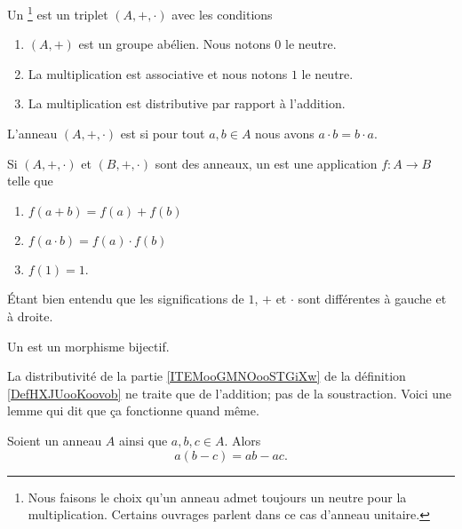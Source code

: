 \begin{definition}     \label{DefHXJUooKoovob}
    Un \footnote{Nous faisons le choix qu'un anneau admet toujours un neutre pour la multiplication. Certains ouvrages parlent dans ce cas d'anneau unitaire.} est un triplet \( (A,+,\cdot)\) avec les conditions
    \begin{enumerate}
        \item
            \( (A,+)\) est un groupe abélien. Nous notons \( 0\) le neutre.
        \item
            La multiplication est associative et nous notons \( 1\) le neutre.
        \item       \label{ITEMooGMNOooSTGiXw}
            La multiplication est distributive par rapport à l'addition.
    \end{enumerate}
    L'anneau \( (A,+,\cdot)\) est  si pour tout \( a,b\in A\) nous avons \( a\cdot b=b\cdot a\).
\end{definition}

\begin{definition}      \label{DEFooSPHPooCwjzuz}
    Si \( (A,+,\cdot)\) et \( (B,+,\cdot)\) sont des anneaux, un  est une application \( f\colon A\to B\) telle que
    \begin{enumerate}
        \item \( f(a+b)=f(a)+f(b)\)
        \item
            \( f(a\cdot b)=f(a)\cdot f(b)\)
        \item
            \( f(1)=1\).
    \end{enumerate}
    Étant bien entendu que les significations de \( 1\), $+$ et \( \cdot\) sont différentes à gauche et à droite.
\end{definition}

\begin{definition}      \label{DEFooKWKGooIOwGTA}
    Un  est un morphisme bijectif.
\end{definition}

La distributivité de la partie \ref{ITEMooGMNOooSTGiXw} de la définition \ref{DefHXJUooKoovob} ne traite que de l'addition; pas de la soustraction. Voici une lemme qui dit que ça fonctionne quand même.
\begin{lemma}     \label{LEMooVPYUooRzexke}
    Soient un anneau \( A\) ainsi que \( a,b,c\in A\). Alors
    \begin{equation}
        a(b-c)=ab-ac.
    \end{equation}
\end{lemma}

